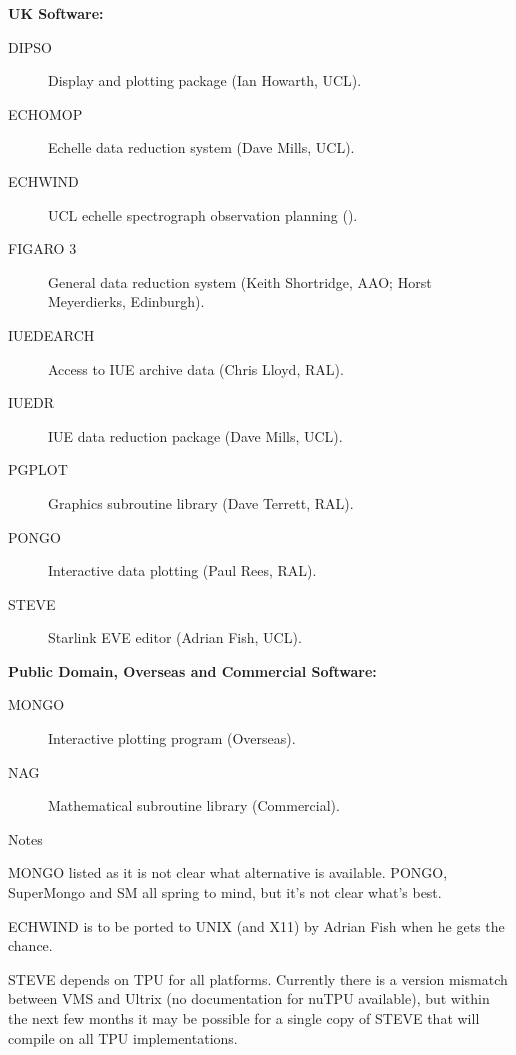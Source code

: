 \begin{center}
{\bf UK Software:}
\end{center}

\begin{description}
\item[DIPSO] Display and plotting package (Ian Howarth, UCL).
\item[ECHOMOP] Echelle data reduction system (Dave Mills, UCL).
\item[ECHWIND] UCL echelle spectrograph observation planning ().
\item[FIGARO 3] General data reduction system (Keith Shortridge, AAO; Horst
Meyerdierks, Edinburgh).
\item[IUEDEARCH] Access to IUE archive data (Chris Lloyd, RAL).
\item[IUEDR] IUE data reduction package (Dave Mills, UCL).
\item[PGPLOT] Graphics subroutine library (Dave Terrett, RAL).
\item[PONGO] Interactive data plotting (Paul Rees, RAL).
\item[STEVE] Starlink EVE editor (Adrian Fish, UCL).
\end{description}


\vspace{5mm}
\begin{center}
{\bf Public Domain, Overseas and Commercial Software:}
\end{center}

\begin{description}
\item[MONGO] Interactive plotting program (Overseas).
\item[NAG] Mathematical subroutine library (Commercial).
\end{description}


\vspace{5mm}
\begin{center}
{\large\sc Notes}
\end{center}

MONGO listed as it is not clear what alternative is available.
PONGO, SuperMongo and SM all spring to mind, but it's not clear what's best.

ECHWIND is to be ported to UNIX (and X11) by Adrian Fish when he gets the
chance.

STEVE depends on TPU for all platforms.
Currently there is a version mismatch between VMS and Ultrix (no documentation
for nuTPU available), but within the next few months it may be possible for a
single copy of STEVE that will compile on all TPU implementations.


